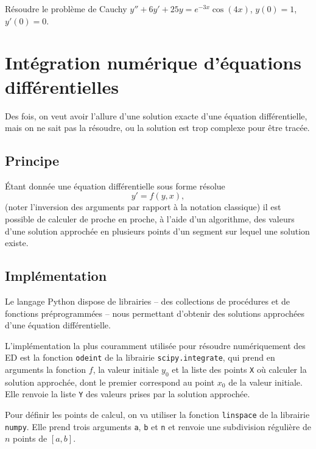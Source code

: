 \documentclass[../main.tex]{subfiles}
\begin{document}
\begin{exo}
	Résoudre le problème de Cauchy $y''+6y'+25y = e^{-3x}\cos(4x)$, $y(0)=1$, $y'(0)=0$.
\end{exo}
\section{Intégration numérique d'équations différentielles}

Des fois, on veut avoir l'allure d'une solution exacte d'une équation différentielle, mais on ne sait pas la résoudre, ou la solution est trop complexe pour être tracée. 

\subsection{Principe}

Étant donnée une équation différentielle sous forme résolue
	\begin{equation}\label{intNum}
		y' = f(y,x),
	\end{equation}
(noter l'inversion des arguments par rapport à la notation classique) il est possible de calculer de proche en proche, à l'aide d'un algorithme, des valeurs d'une solution approchée en plusieurs points d'un segment sur lequel une solution existe.

\subsection{Implémentation}

Le langage \textsf{Python} dispose de librairies -- des collections de procédures et de fonctions préprogrammées -- nous permettant d'obtenir des solutions approchées d'une équation différentielle.

L'implémentation la plus couramment utilisée pour résoudre numériquement des ED est la fonction \texttt{odeint} de la librairie \texttt{scipy.integrate}, qui prend en arguments la fonction $f$, la valeur initiale $y_0$ et la liste des points \texttt{X} où calculer la solution approchée, dont le premier correspond au point $x_0$ de la valeur initiale. Elle renvoie la liste \texttt{Y} des valeurs prises par la solution approchée.

Pour définir les points de calcul, on va utiliser la fonction \texttt{linspace} de la librairie \texttt{numpy}. Elle prend trois arguments \texttt{a}, \texttt{b} et \texttt{n} et renvoie une subdivision régulière de $n$ points de $[a,b]$.
\end{document}
